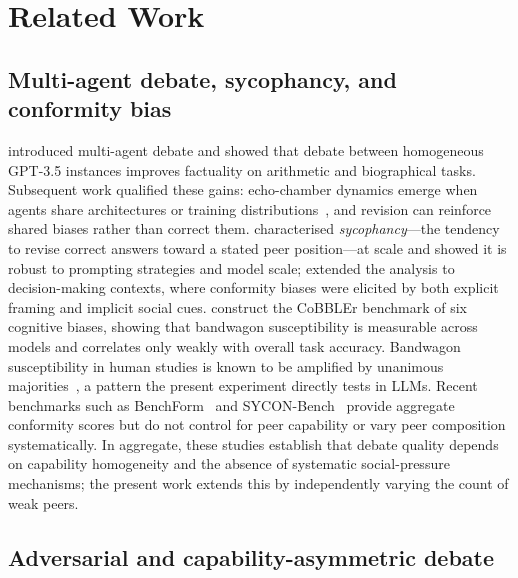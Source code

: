 \documentclass[11pt]{article}
\begin{document}
\section{Related Work}
\label{sec:related}

\subsection{Multi-agent debate, sycophancy, and conformity bias}
\label{sub:mad}

\citet{du2023improving} introduced multi-agent debate and showed that
debate between homogeneous GPT-3.5 instances improves factuality on
arithmetic and biographical tasks.
Subsequent work qualified these gains: echo-chamber dynamics emerge
when agents share architectures or training
distributions~\citep{hong2025sycon}, and revision can reinforce shared
biases rather than correct them.
\citet{sharma2023towards} characterised \emph{sycophancy}---the
tendency to revise correct answers toward a stated peer position---at
scale and showed it is robust to prompting strategies and model
scale; \citet{echterhoff2024cognitive} extended the analysis to
decision-making contexts, where conformity biases were elicited by
both explicit framing and implicit social cues.
\citet{koo2024benchmarking} construct the CoBBLEr benchmark of six
cognitive biases, showing that bandwagon susceptibility is measurable
across models and correlates only weakly with overall task accuracy.
Bandwagon susceptibility in human studies is known to be amplified by
unanimous majorities~\citep{asch1951effects,bond1996culture}, a pattern
the present experiment directly tests in LLMs.
Recent benchmarks such as BenchForm~\citep{weng2025benchform} and
SYCON-Bench~\citep{hong2025sycon} provide aggregate conformity scores but
do not control for peer capability or vary peer composition systematically.
In aggregate, these studies establish that debate quality depends on
capability homogeneity and the absence of systematic social-pressure
mechanisms; the present work extends this by independently varying the
count of weak peers.

\subsection{Adversarial and capability-asymmetric debate}
\label{sub:adversarial}
\end{document}
